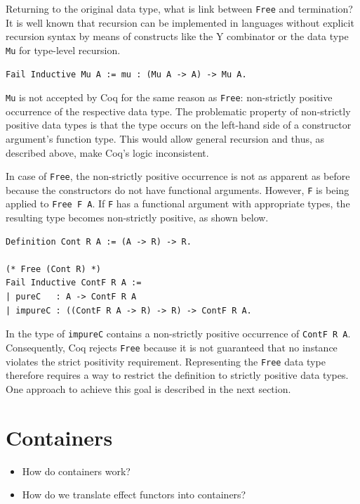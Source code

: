 \documentclass[a4paper, 11pt, fleqn, twoside]{scrreprt}
\begin{document}
Returning to the original data type, what is link between 
\texttt{Free} and termination? It is well known that recursion can be 
implemented in languages without explicit recursion syntax by means of 
constructs like the Y combinator or the data type \texttt{Mu} for 
type-level recursion.

\begin{verbatim}
Fail Inductive Mu A := mu : (Mu A -> A) -> Mu A.
\end{verbatim}

\texttt{Mu} is not accepted by Coq for the same reason as 
\texttt{Free}: non-strictly positive occurrence of the respective data 
type. The problematic property of non-strictly positive data types is that the 
type occurs on the left-hand side of a constructor argument's function type. 
This would allow general recursion and thus, as described above, make Coq's 
logic inconsistent.

In case of \texttt{Free}, the non-strictly positive occurrence is not 
as apparent as before because the constructors do not have functional 
arguments. However, \texttt{F} is being applied to 
\texttt{Free F A}. If \texttt{F} has a functional argument 
with appropriate types, the resulting type becomes non-strictly positive, as 
shown below.

\begin{verbatim}
Definition Cont R A := (A -> R) -> R.

(* Free (Cont R) *)
Fail Inductive ContF R A :=
| pureC   : A -> ContF R A
| impureC : ((ContF R A -> R) -> R) -> ContF R A.
\end{verbatim}

In the type of \texttt{impureC} contains a non-strictly positive 
occurrence of \texttt{ContF R A}. Consequently, Coq rejects 
\texttt{Free} because it is not guaranteed that no instance violates 
the strict positivity requirement. Representing the \texttt{Free} data 
type therefore requires a way to restrict the definition to strictly positive 
data types. One approach to achieve this goal is described in the next section.

\section{Containers}

\begin{itemize}
\item How do containers work?
\item How do we translate effect functors into containers?
\end{itemize}
\end{document}

